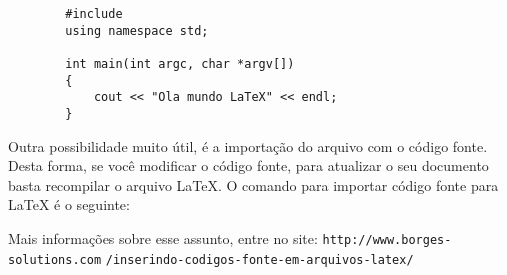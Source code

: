 \documentclass[brazil]{abnt-UVV/abnt-uvv}
\begin{document}
\begin{lstlisting}
        #include 
        using namespace std;
 
        int main(int argc, char *argv[])
        {
            cout << "Ola mundo LaTeX" << endl;
        }
\end{lstlisting}

Outra possibilidade muito útil, é a importação do arquivo com o código fonte. Desta forma, se você modificar o código fonte, para atualizar o seu documento basta recompilar o arquivo LaTeX. O comando para importar código fonte para LaTeX é o seguinte:



Mais informações sobre esse assunto, entre no site: \verb+http://www.borges-solutions.com+
\verb+/inserindo-codigos-fonte-em-arquivos-latex/+



\end{document}
